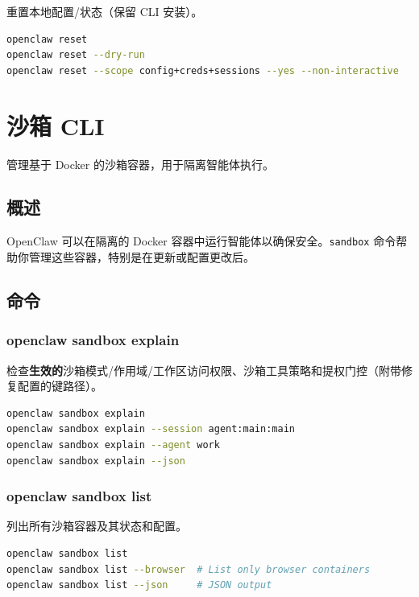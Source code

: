 重置本地配置/状态（保留 CLI 安装）。

\begin{lstlisting}[language=bash]
openclaw reset
openclaw reset --dry-run
openclaw reset --scope config+creds+sessions --yes --non-interactive
\end{lstlisting}



\clearpage

\section{沙箱 CLI}


管理基于 Docker 的沙箱容器，用于隔离智能体执行。

\subsection{概述}


OpenClaw 可以在隔离的 Docker 容器中运行智能体以确保安全。\texttt{sandbox} 命令帮助你管理这些容器，特别是在更新或配置更改后。

\subsection{命令}


\subsubsection{openclaw sandbox explain}


检查\textbf{生效的}沙箱模式/作用域/工作区访问权限、沙箱工具策略和提权门控（附带修复配置的键路径）。

\begin{lstlisting}[language=bash]
openclaw sandbox explain
openclaw sandbox explain --session agent:main:main
openclaw sandbox explain --agent work
openclaw sandbox explain --json
\end{lstlisting}


\subsubsection{openclaw sandbox list}


列出所有沙箱容器及其状态和配置。

\begin{lstlisting}[language=bash]
openclaw sandbox list
openclaw sandbox list --browser  # List only browser containers
openclaw sandbox list --json     # JSON output
\end{lstlisting}



